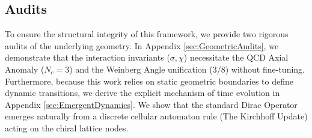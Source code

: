 \subsection{Audits}
To ensure the structural integrity of this framework, we provide two rigorous audits of the underlying geometry. In Appendix \ref{sec:GeometricAudits}, we demonstrate that the interaction invariants ($\sigma, \chi$) necessitate the QCD Axial Anomaly ($N_c=3$) and the Weinberg Angle unification ($3/8$) without fine-tuning. Furthermore, because this work relies on static geometric boundaries to define dynamic transitions, we derive the explicit mechanism of time evolution in Appendix \ref{sec:EmergentDynamics}. We show that the standard Dirac Operator emerges naturally from a discrete cellular automaton rule (The Kirchhoff Update) acting on the chiral lattice nodes.